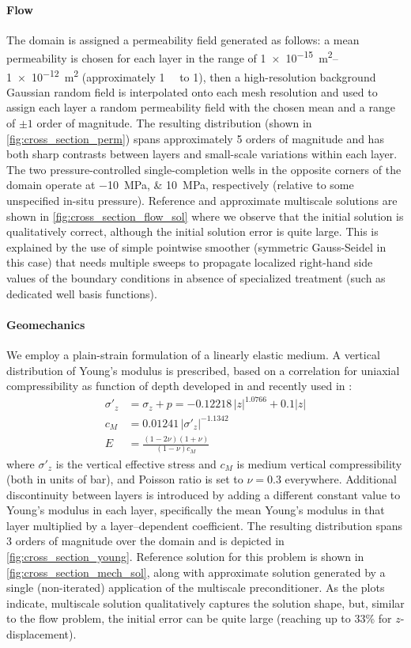\paragraph{Flow}
The domain is assigned a permeability field generated as follows: a mean permeability is chosen for each layer in the range of \qtyrange{1e-15}{1e-12}{m^2} (approximately \qty{1}{\milli\darcy} to \qty{1}{\darcy}), then a high-resolution background Gaussian random field is interpolated onto each mesh resolution and used to assign each layer a random permeability field with the chosen mean and a range of $\pm1$ order of magnitude.   The resulting distribution (shown in \cref{fig:cross_section_perm}) spans approximately 5 orders of magnitude and has both sharp contrasts between layers and small-scale variations within each layer.   The two pressure-controlled single-completion wells in the opposite corners of the domain operate at \qtylist{-10;+10}{\MPa}, respectively (relative to some unspecified in-situ pressure).   Reference and approximate multiscale solutions are shown in \cref{fig:cross_section_flow_sol} where we observe that the initial solution is qualitatively correct, although the initial solution error is quite large.   This is explained by the use of simple pointwise smoother (symmetric Gauss-Seidel in this case) that needs multiple sweeps to propagate localized right-hand side values of the boundary conditions in absence of specialized treatment (such as dedicated well basis functions).

\paragraph{Geomechanics}
We employ a plain-strain formulation of a linearly elastic medium.   A vertical distribution of Young's modulus is prescribed, based on a correlation for uniaxial compressibility as function of depth developed in \cite{Bau2002} and recently used in \cite{Castelletto2017}:
\begin{align}
    \sigma'_z &= \sigma_z + p = -0.12218 \, |z|^{1.0766} + 0.1|z| \\
    c_M &= 0.01241 \,|\sigma'_z|^{-1.1342} \\
    E &= \frac{(1-2\nu)(1+\nu)}{(1-\nu)c_M}
    \label{eq:youngs_modulus_bau_etal}
\end{align}
where $\sigma'_z$ is the vertical effective stress and $c_M$ is medium vertical compressibility (both in units of \unit{\bar}), and Poisson ratio is set to $\nu = 0.3$ everywhere.   Additional discontinuity between layers is introduced by adding a different constant value to Young's modulus in each layer, specifically the mean Young's modulus in that layer multiplied by a layer--dependent coefficient.   The resulting distribution spans 3 orders of magnitude over the domain and is depicted in \cref{fig:cross_section_young}.   Reference solution for this problem is shown in \cref{fig:cross_section_mech_sol}, along with approximate solution generated by a single (non-iterated) application of the multiscale preconditioner.   As the plots indicate, multiscale solution qualitatively captures the solution shape, but, similar to the flow problem, the initial error can be quite large (reaching up to 33\% for $z$-displacement).

